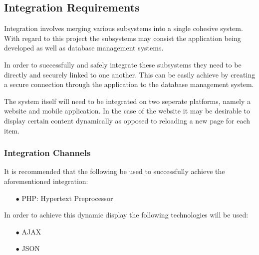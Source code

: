 \documentclass[a4paper,12pt]{article}
\begin{document}
\subsection{Integration Requirements}
Integration involves merging various subsystems into a single cohesive system. With regard to this project the subsystems may consist the application being developed as well as database management systems.

In order to successfully and safely integrate these subsystems they need to be directly and securely linked to one another. This can be easily achieve by creating a secure connection through the application to the database management system. 

The system itself will need to be integrated on two seperate platforms, namely a website and mobile application. In the case of the website it may be desirable to display certain content dynamically as opposed to reloading a new page for each item.

\subsubsection{Integration Channels}
It is recommended that the following be used to successfully achieve the aforementioned integration:
\begin{itemize}
	\item[$\bullet$]PHP: Hypertext Preprocessor
\end{itemize}
In order to achieve this dynamic display the following technologies will be used:
 \begin{itemize}
	\item[$\bullet$]AJAX
	\item[$\bullet$]JSON
\end{itemize}
\end{document}

